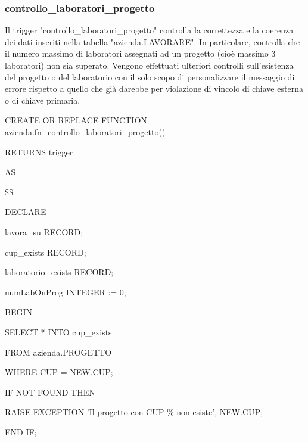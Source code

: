     \subsubsection{controllo\_laboratori\_progetto}
    Il trigger "controllo\_laboratori\_progetto" controlla la correttezza e la coerenza dei dati inseriti nella tabella "azienda.LAVORARE". In particolare, controlla che il numero massimo di laboratori assegnati ad un progetto (cioè massimo 3 laboratori) non sia superato. Vengono effettuati ulteriori controlli sull'esistenza del progetto o del laboratorio con il solo scopo di personalizzare il messaggio di errore rispetto a quello che già darebbe per violazione di vincolo di chiave esterna o di chiave primaria.
    \ttfamily
        \begin{flushleft}
            \begin{description}
                \item CREATE OR REPLACE FUNCTION azienda.fn\_controllo\_laboratori\_progetto()  
                \item RETURNS trigger
                \item AS
                \item \$\$
                \item DECLARE
                \begin{description}
                    \item lavora\_su RECORD;
                    \item cup\_exists RECORD;
                    \item laboratorio\_exists RECORD;
                    \item numLabOnProg INTEGER := 0;
                \end{description}
                \item BEGIN 
                \begin{description}
                    \item SELECT * INTO cup\_exists
                    \item FROM azienda.PROGETTO 
                    \item WHERE CUP = NEW.CUP;
                
                    \vspace{0.5cm}

                    \item IF NOT FOUND THEN
                    \begin{description}
                        \item RAISE EXCEPTION 'Il progetto con CUP \% non esiste', NEW.CUP;
                    \end{description}
                    \item END IF;
                

\end{description}
\end{description}
\end{flushleft}
